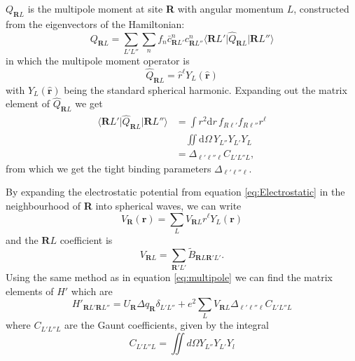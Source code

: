 \documentclass{article}
\begin{document}
\begin{multicols}{2}
$Q_{\textbf{R}L}$ is the multipole moment at site \textbf{R} with angular momentum $L$, constructed from the eigenvectors of the Hamiltonian:
\begin{equation}
	\label{eq:multipole}
	Q_{\textbf{R}L}=\sum_{L'L''}\sum_{n}f_{n}\bar{c}^{n}_{\textbf{R}L'}c^{n}_{\textbf{R}L''}\bigg \langle\textbf{R}L'\bigg | \hat{Q}_{\textbf{R}L}\bigg |\textbf{R}L''\bigg \rangle
\end{equation}
in which the multipole moment operator is \cite{stone2013theory}
\begin{equation}
	\hat{Q}_{\textbf{R}L}=\hat{r}^{\ell}Y_{L}(\hat{\textbf{r}})
\end{equation}
with $Y_{L}(\hat{\textbf{r}})$ being the standard spherical harmonic. Expanding out the matrix element of $\hat{Q}_{\textbf{R}L}$ we get
\begin{equation}
	\label{eq:Delta}
	\begin{split}
		 \bigg \langle \textbf{R}L' \bigg | {\hat{Q}}_{\textbf{R}L} \bigg | \textbf{R}L'' \bigg \rangle &=\int r^{2}\text{d}r\,f_{R\ell'}f_{R\ell''}r^{\ell}\\&\,\,\,\,\,\,\iint \text{d}\Omega \,Y_{L''}Y_{L'}Y_{L} \\
		&=\Delta_{\ell'\ell''\ell}C_{L'L''L},
	\end{split}
\end{equation} 
from which we get the tight binding parameters $\Delta_{\ell'\ell''\ell}$.

By expanding the electrostatic potential from equation \ref{eq:Electrostatic} in the neighbourhood of \textbf{R} into spherical waves, we can write
\begin{equation}
	V_{\textbf{R}}(\textbf{r})=\sum_L V_{\textbf{R}L}r^{\ell}Y_{L}(\textbf{r})
\end{equation}
and the $\textbf{R}L$ coefficient is 
\begin{equation}
	V_{\textbf{R}L}=\sum_{\textbf{R}'L'}\tilde{B}_{\textbf{R}L\textbf{R}'L'}.
\end{equation}
Using the same method as in equation \ref{eq:multipole} we can find the matrix elements of $H'$ which are 
\begin{equation}
	H'_{\textbf{R}L'\textbf{R}L''}=U_{\textbf{R}}\Delta q_{\textbf{R}}\delta_{L'L''}+e^{2}\sum_L V_{\textbf{R}L}\Delta_{\ell'\ell''\ell}C_{L'L''L}
\end{equation}
where $C_{L'L''L}$ are the Gaunt coefficients, given by the integral
\begin{equation}
	C_{L'L''L} = \iint d\Omega Y_{L''}Y_{L'}Y_{l}
\end{equation}


\end{multicols}
\end{document}
